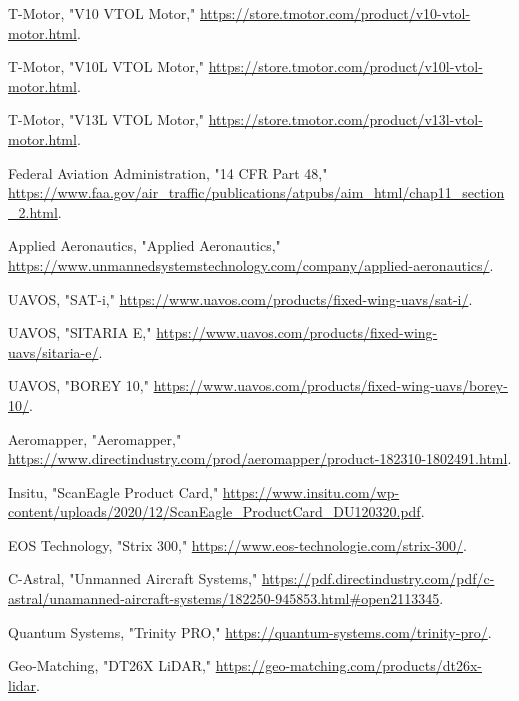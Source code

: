 \documentclass[12pt]{article}
\begin{document}
		\newpage

			\begin{thebibliography}{99}
				
				T-Motor, "V10 VTOL Motor," \url{https://store.tmotor.com/product/v10-vtol-motor.html}.
				
				T-Motor, "V10L VTOL Motor," \url{https://store.tmotor.com/product/v10l-vtol-motor.html}.
				
				T-Motor, "V13L VTOL Motor," \url{https://store.tmotor.com/product/v13l-vtol-motor.html}.
								
				Federal Aviation Administration, "14 CFR Part 48," \url{https://www.faa.gov/air_traffic/publications/atpubs/aim_html/chap11_section_2.html}.
				
				Applied Aeronautics, "Applied Aeronautics," \url{https://www.unmannedsystemstechnology.com/company/applied-aeronautics/}.
				
				UAVOS, "SAT-i," \url{https://www.uavos.com/products/fixed-wing-uavs/sat-i/}.
				
				UAVOS, "SITARIA E," \url{https://www.uavos.com/products/fixed-wing-uavs/sitaria-e/}.
				
				UAVOS, "BOREY 10," \url{https://www.uavos.com/products/fixed-wing-uavs/borey-10/}.
				
				Aeromapper, "Aeromapper," \url{https://www.directindustry.com/prod/aeromapper/product-182310-1802491.html}.
				
				Insitu, "ScanEagle Product Card," \url{https://www.insitu.com/wp-content/uploads/2020/12/ScanEagle_ProductCard_DU120320.pdf}.
				
				EOS Technology, "Strix 300," \url{https://www.eos-technologie.com/strix-300/}.
				
				C-Astral, "Unmanned Aircraft Systems," \url{https://pdf.directindustry.com/pdf/c-astral/unamanned-aircraft-systems/182250-945853.html#open2113345}.
				
				Quantum Systems, "Trinity PRO," \url{https://quantum-systems.com/trinity-pro/}.
				
				Geo-Matching, "DT26X LiDAR," \url{https://geo-matching.com/products/dt26x-lidar}.
				

\end{thebibliography}
\end{document}
